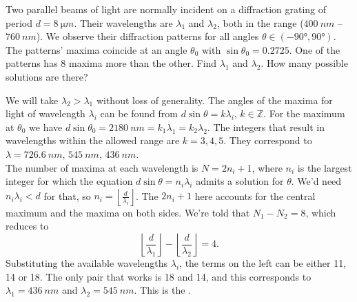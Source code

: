 \documentclass[../TST.tex]{subfiles}
\begin{document}
\begin{pproblem}
Two parallel beams of light are normally incident on a diffraction grating of period $d=\qty{8}{\micro m}$. Their wavelengths are $\lambda_1$ and $\lambda_2$, both in the range ($\qty{400}{nm}$ -- $\qty{760}{nm}$). We observe their diffraction patterns for all angles $\theta\in(\ang{-90},\ang{90})$. The patterns' maxima coincide at an angle $\theta_0$ with $\sin{\theta_0}=0.2725$. One of the patterns has 8 maxima more than the other. Find $\lambda_1$ and $\lambda_2$. How many possible solutions are there?
\end{pproblem}

\ifprob \else
	\begin{solution} We will take $\lambda_2>\lambda_1$ without loss of generality. The angles of the maxima for light of wavelength $\lambda_i$ can be found from $d\sin{\theta}=k\lambda_i$, $k\in\mathbb{Z}$. For the maximum at $\theta_0$ we have $d\sin{\theta_0}=\qty{2180}{nm}=k_1\lambda_1=k_2\lambda_2$. The integers that result in wavelengths within the allowed range are $k=3,4,5$. They correspond to $\lambda = \qty{726.6}{nm},\,\qty{545}{nm},\,\qty{436}{nm}$.\\[5pt]
	The number of maxima at each wavelength is $N=2n_i+1$, where $n_i$ is the largest integer for which the equation $d\sin{\theta}=n_i\lambda_i$ admits a solution for $\theta$. We'd need $n_i\lambda_i<d$ for that, so $n_i=\left\lfloor \frac{d}{\lambda_i}\right\rfloor$. The $2n_i+1$ here accounts for the central maximum and the maxima on both sides. We're told that $N_1-N_2=8$, which reduces to
		\begin{equation*}
		\left\lfloor \frac{d}{\lambda_1}\right\rfloor - \left\lfloor \frac{d}{\lambda_2}\right\rfloor =4
		.
		\end{equation*}
		Substituting the available wavelengths $\lambda_i$, the terms on the left can be either 11, 14 or 18. The only pair that works is 18 and 14, and this corresponds to $\boxed{\lambda_1=\qty{436}{nm}}$ and $\boxed{\lambda_2=\qty{545}{nm}}$. This is the .
\end{solution}
\fi
\end{document}

